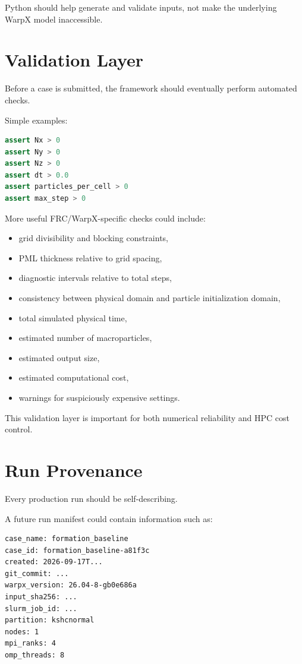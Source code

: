 \documentclass[11pt,a4paper]{article}
\begin{document}
Python should help generate and validate inputs, not make the underlying WarpX model inaccessible.

\section{Validation Layer}

Before a case is submitted, the framework should eventually perform automated checks.

Simple examples:

\begin{lstlisting}[language=Python]
assert Nx > 0
assert Ny > 0
assert Nz > 0
assert dt > 0.0
assert particles_per_cell > 0
assert max_step > 0
\end{lstlisting}

More useful FRC/WarpX-specific checks could include:

\begin{itemize}
    \item grid divisibility and blocking constraints,
    \item PML thickness relative to grid spacing,
    \item diagnostic intervals relative to total steps,
    \item consistency between physical domain and particle initialization domain,
    \item total simulated physical time,
    \item estimated number of macroparticles,
    \item estimated output size,
    \item estimated computational cost,
    \item warnings for suspiciously expensive settings.
\end{itemize}

This validation layer is important for both numerical reliability and HPC cost control.

\section{Run Provenance}

Every production run should be self-describing.

A future run manifest could contain information such as:

\begin{lstlisting}
case_name: formation_baseline
case_id: formation_baseline-a81f3c
created: 2026-09-17T...
git_commit: ...
warpx_version: 26.04-8-gb0e686a
input_sha256: ...
slurm_job_id: ...
partition: kshcnormal
nodes: 1
mpi_ranks: 4
omp_threads: 8
\end{lstlisting}
\end{document}
